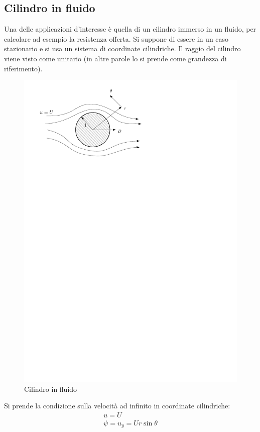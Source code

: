 \subsection{Cilindro in fluido}
Una delle applicazioni d'interesse è quella di un cilindro immerso in un fluido, per calcolare ad esempio la resistenza offerta.
Si suppone di essere in un caso stazionario e si usa un sistema di coordinate cilindriche.
Il raggio del cilindro viene visto come unitario (in altre parole lo si prende come grandezza di riferimento).
	\begin{figure}[ht]
		\includegraphics[scale=0.7]{./6.4 Correnti a basso numero di Reynolds/6.4-1}
		\centering
		\caption{Cilindro in fluido}
	\end{figure}
%
Si prende la condizione sulla velocità ad infinito in coordinate cilindriche:
%
	\begin{equation*}
		\begin{gathered}
			u = U\\
			\psi = u_y = U r \sin{\theta}
		\end{gathered}
	\end{equation*}
